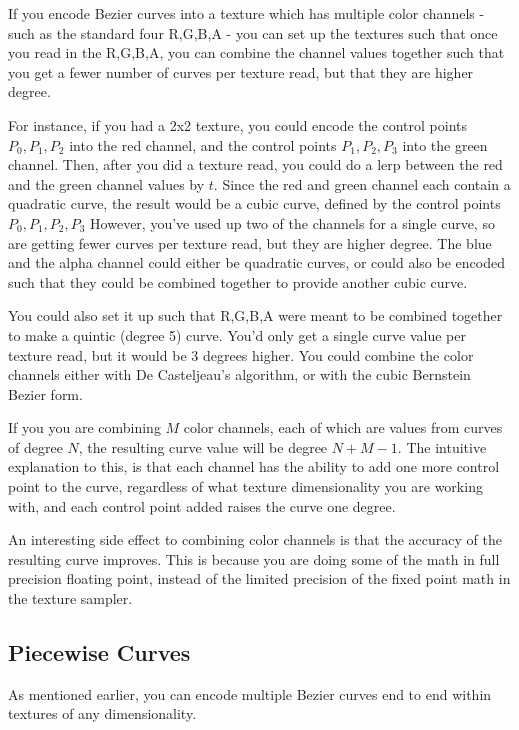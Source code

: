 \documentclass{jcgt}
\begin{document}
If you encode Bezier curves into a texture which has multiple color channels - such as the standard four R,G,B,A - you can set up the textures such that once you read in the R,G,B,A, you can combine the channel values together such that you get a fewer number of curves per texture read, but that they are higher degree.

For instance, if you had a 2x2 texture, you could encode the control points $P_0,P_1,P_2$ into the red channel, and the control points $P_1,P_2,P_3$ into the green channel.  Then, after you did a texture read, you could do a lerp between the red and the green channel values by $t$.  Since the red and green channel each contain a quadratic curve, the result would be a cubic curve, defined by the control points $P_0,P_1,P_2,P_3$  However, you've used up two of the channels for a single curve, so are getting fewer curves per texture read, but they are higher degree.  The blue and the alpha channel could either be quadratic curves, or could also be encoded such that they could be combined together to provide another cubic curve.

You could also set it up such that R,G,B,A were meant to be combined together to make a quintic (degree 5) curve.  You'd only get a single curve value per texture read, but it would be 3 degrees higher.  You could combine the color channels either with De Casteljeau's algorithm, or with the cubic Bernstein Bezier form. 

If you you are combining $M$ color channels, each of which are values from curves of degree $N$, the resulting curve value will be degree $N+M-1$.  The intuitive explanation to this, is that each channel has the ability to add one more control point to the curve, regardless of what texture dimensionality you are working with, and each control point added raises the curve one degree.

An interesting side effect to combining color channels is that the accuracy of the resulting curve improves.  This is because you are doing some of the math in full precision floating point, instead of the limited precision of the fixed point math in the texture sampler.

\subsection{Piecewise Curves}

As mentioned earlier, you can encode multiple Bezier curves end to end within textures of any dimensionality.
\end{document}
